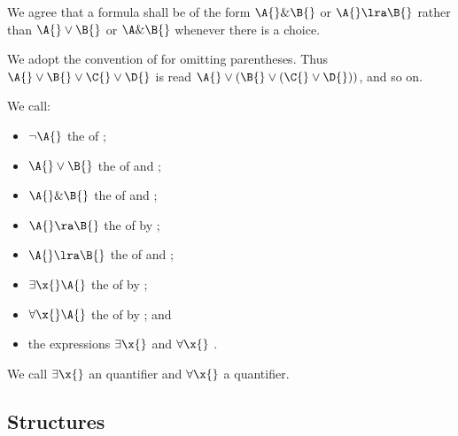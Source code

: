 \begin{remark}
    We agree that a formula shall be of the form $\A{} \& \B{}$ or $\A{} \lra \B{}$ rather than $\A{} \vee \B{}$ or $\A \& \B{}$ whenever there is a choice.
    
    We adopt the convention of  for omitting parentheses.
    Thus $\A{} \vee \B{} \vee \C{} \vee \D{}$ is read $\A{} \vee (\B{} \vee (\C{} \vee \D{}))$, and so on.
\end{remark}

\newpage
We call:
    \begin{itemize}
        \item $\neg \A{}$ the  of \A{};
        \item $\A{} \vee \B{}$ the  of \A{} and \B{};
        \item $\A{} \& \B{}$ the  of \A{} and \B{};
        \item $\A{} \ra \B{}$ the  of \B{} by \A{};
        \item $\A{} \lra \B{}$ the  of \A{} and \B{};
        \item $\exists \x{} \A{}$ the  of \A{} by \x{};
        \item $\forall \x{} \A{}$ the  of \A{} by \x{}; and
        \item the expressions $\exists \x{}$ and $\forall \x{}$  \x{}.
    \end{itemize}

\begin{remark}
        We call $\exists \x{}$ an  quantifier and $\forall \x{}$ a  quantifier.
\end{remark}


\subsection{Structures}

